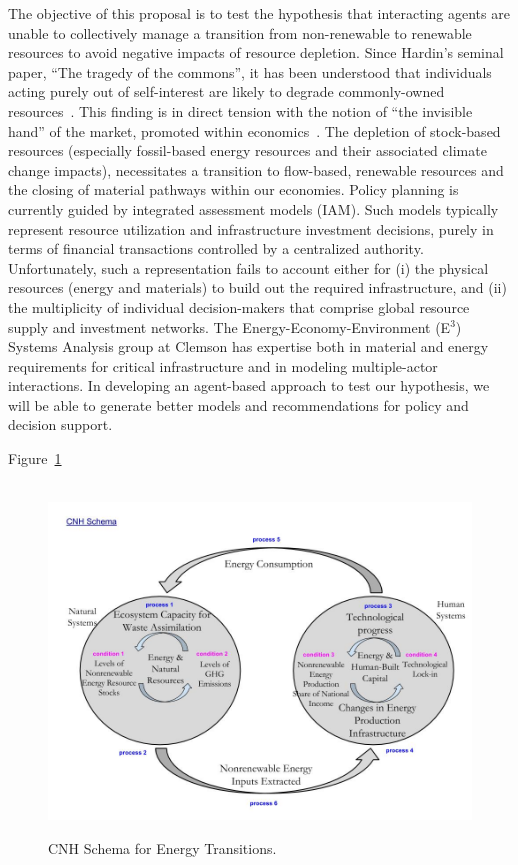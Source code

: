 \documentclass[11pt,a4paper]{article}
\begin{document}
The objective of this proposal is to test the hypothesis that 
interacting agents are unable to collectively manage 
a transition from non-renewable to renewable resources 
to avoid negative impacts of resource depletion. 
Since Hardin's seminal paper, ``The tragedy of the commons'',
it has been understood that individuals acting purely out of self-interest
are likely to degrade commonly-owned resources~\cite{Hardin1968}.
This finding is in direct tension with the notion of
``the invisible hand'' of the market,
promoted within economics~\cite{Smith1776}.
The depletion of stock-based resources
(especially fossil-based energy resources
and their associated climate change impacts),
necessitates a transition to flow-based, renewable resources
and the closing of material pathways within our economies.
Policy planning is currently guided by integrated assessment models (IAM).
Such models typically represent resource utilization and infrastructure investment decisions,
purely in terms of financial transactions controlled by a centralized authority.
Unfortunately, such a representation fails to account either for
(i) the physical resources (energy and materials) 
to build out the required infrastructure, and
(ii) the multiplicity of individual decision-makers that comprise 
global resource supply and investment networks.
The Energy-Economy-Environment (E$^3$) Systems Analysis group
at Clemson has expertise both in 
material and energy requirements for critical infrastructure 
and in modeling multiple-actor interactions.
In developing an agent-based approach to test our hypothesis,
we will be able to generate better models and recommendations 
for policy and decision support.

Figure~\ref{fig:CNH_Schema}

\begin{figure}
\centering\
\includegraphics[width=\linewidth]{CNH_Schema.jpg}
\caption[CNH Schema]{CNH Schema for Energy Transitions.}
\label{fig:CNH_Schema}
\end{figure}
\end{document}
